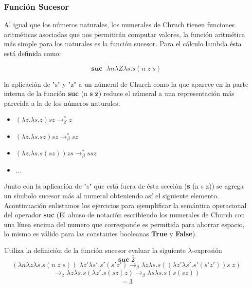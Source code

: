     \subsubsection{Función Sucesor}
        Al igual que los números naturales, los numerales de Chruch tienen funciones aritméticas asociadas que nos permitirán computar valores, la función aritmética más simple para los naturales es la función sucesor. Para el cálculo lambda ésta está definida como:
        \begin{definition}
            $$\textbf{suc } \; \lambda n\lambda Z\lambda s. s(n \; z \; s)$$
        \end{definition}
    
        la aplicación de "s" y "z" a un númeral de Church como la que aparece en la parte interna de la función \textbf{suc} (n \textbf{s} \textbf{z}) reduce el númeral a una representación más parecida a la de los números naturales:    
        \begin{itemize}
            \item $(\lambda z.\lambda s.z)sz \rightarrow_\beta^* z$
            \item $(\lambda z.\lambda s.sz)sz  \rightarrow_\beta^* sz$
            \item $(\lambda z.\lambda s.s(sz))zs \rightarrow_\beta^* ssz$
            \item ...
        \end{itemize}

        Junto con la aplicación de "s" que está fuera de ésta sección (\textbf{s} (n s z)) se agrega un símbolo sucesor más al numeral obteniendo así el siguiente elemento.\\

        Acontinuación enlistamos los ejercicios para ejemplificar la semántica operacional del operador \textbf{suc} (El abuso de notación escribiendo los numerales de Church con una línea encima del numero que corresponde es permitida para ahorrar espacio, lo mismo es válido para las constantes booleanas \textbf{True} y \textbf{False}).

        \bigskip

        \begin{exercise}
            Utiliza la definición de la función sucesor evaluar la siguiente  $\lambda$-expresión
            \[
                \textbf{suc } \overline{2}
            \]
            \[
                (\lambda n\lambda z\lambda s.s(n \; z \; s) ) \; \lambda z'\lambda s'.s'(s'z') \rightarrow_\beta \lambda z\lambda s.s((\lambda z'\lambda s'.s'(s'z')) s \; z)
            \]
            \[
                \rightarrow_\beta \lambda z\lambda s.s(\lambda z'.s(sz) z) \rightarrow_\beta \lambda s\lambda s.s(s(sz))
            \]
            \[
                = \overline{3}
            \]
        \end{exercise}

